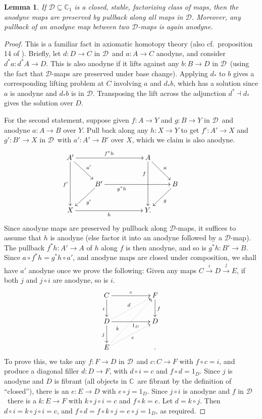 \documentclass[12pt]{article}
\newcommand{\C}{\ensuremath{\mathbb{C}}}
\newcommand{\D}{\ensuremath{\mathcal{D}}}
\newtheorem{lemma}[theorem]{Lemma}
\theoremstyle{definition}
\begin{document}
\begin{lemma}\label{lemma:anodynestable}
If $\D \subseteq \C_1$ is a closed, stable, factorizing class of maps, then the anodyne maps are preserved by pullback along all maps in \D. Moreover, any pullback of an anodyne map between two \D-maps is again anodyne.
\end{lemma}
\begin{proof}
This is a familiar fact in axiomatic homotopy theory (also cf.~proposition 14 of \cite{GG}).  Briefly, let $d : D \to C$ in \D\ and $a :A\to C$ anodyne, and consider $d^*a : d^*A \to D$. This is also anodyne if it lifts against any $b : B \to D$ in \D\ (using the fact that \D-maps are preserved under base change).  Applying $d_*$ to $b$ gives a corresponding lifting problem at $C$ involving $a$ and $d_*b$, which has a solution since $a$ is anodyne and $d_*b$ is in \D.  Transposing the lift across the adjunction $d^* \dashv d_*$ gives the solution over $D$.

For the second statement, suppose given $f : A \to Y$ and $g : B \to Y$ in \D\ and anodyne $a : A \to B$ over $Y$. Pull back along any $h : X \to Y$ to get $f' : A' \to X$ and $g' : B' \to X$ in \D\ with $a' : A' \to B'$ over $X$, which we claim is also anodyne. \[ \xymatrix{ A' \ar[dd]_{f'} \ar[rd]^{a'} \ar[rrr]^{f^*h} &&& A \ar[dd]_(.3){f} \ar[rd]^{a} \\ & B' \ar[ld]^{g'} \ar[rrr]_(.3){g^*h} &&& B \ar[ld]^{g} & \\ X \ar[rrr]_{h} &&& Y .} \] Since anodyne maps are preserved by pullback along \D-maps, it suffices to assume that $h$ is anodyne (else factor it into an anodyne followed by a \D-map). The pullback $f^*h : A' \to A$ of $h$ along $f$ is then anodyne, and so is $g^*h : B' \to B$. Since $a \circ f^*h = g^*h \circ a'$, and anodyne maps are closed under composition, we shall have $a'$ anodyne once we prove the following: Given any maps $C \stackrel{i}{\to} D \stackrel{j}{\to} E$, if both $j$ and $j \circ i$ are anodyne, so is $i$. \[ \xymatrix{ C \ar[d]_{i} \ar[rr]^{c} && F \ar[d]^{f} \\ D \ar[d]_{j} \ar[rr]_(.6){1_D} \ar@{.>}[rru]^d && D \\ E \ar@{.>}[rru]_{e} \ar@{.>}[rruu]^(.3){k} &&.} \] To prove this, we take any $f : F \to D$ in \D\ and $c : C \to F$ with $f\circ c = i$, and produce a diagonal filler $d : D \to F$, with $d\circ i = c$ and $f\circ d = 1_D$. Since $j$ is anodyne and $D$ is fibrant (all objects in \C\ are fibrant by the definition of ``closed''), there is an $e : E \to D$ with $e\circ j = 1_D$. Since $j\circ i$ is anodyne and $f$ in \D\ there is a $k : E \to F$ with $k\circ j\circ i = c$ and $f\circ k = e$. Let $d = k\circ j$. Then $d\circ i = k\circ j\circ i = c$, and $f\circ d = f\circ k\circ j = e\circ j = 1_D$, as required.
\end{proof}
\end{document}
